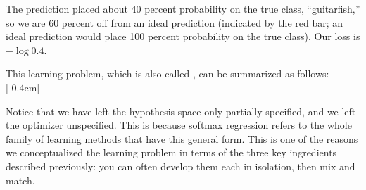 The prediction placed about 40 percent probability on the true class, ``guitarfish,'' so we are 60 percent off from an ideal prediction (indicated by the red bar; an ideal prediction would place 100 percent probability on the true class). Our loss is $-\log 0.4$.

This learning problem, which is also called , can be summarized as follows:[-0.4cm]

\begin{center}
\end{center}
Notice that we have left the hypothesis space only partially specified, and we left the optimizer unspecified. This is because softmax regression refers to the whole family of learning methods that have this general form. This is one of the reasons we conceptualized the learning problem in terms of the three key ingredients described previously: you can often develop them each in isolation, then mix and match.


